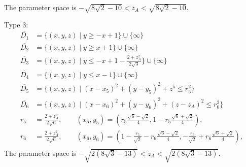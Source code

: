 \documentclass[suppldata, dvipdfmx]{interact}
\theoremstyle{plain}%
\theoremstyle{definition}
\theoremstyle{remark}
\theoremstyle{problemstyle}
\begin{document}
The parameter space is $-\sqrt{8\sqrt{2}-10} < z_A < \sqrt{8\sqrt{2} - 10}$.
\bigskip\par
Type 3:
\begin{align*}
\overline{D_1}&= \{ (x,y,z) \mid y \ge -x + 1 \} \cup \{ \infty \}\\
\overline{D_2}&= \{ (x,y,z) \mid y \ge x + 1 \} \cup \{ \infty \}\\
\overline{D_3}&= \{ (x,y,z) \mid y \le -x + 1 -\frac{2 + z_A^2}{2\sqrt{3}} \} \cup \{ \infty \}\\
\overline{D_4}&= \{ (x,y,z) \mid y \le x - 1 \} \cup \{ \infty \}\\
\overline{D_5}&=\{(x,y,z) \mid (x-x_5)^2+(y-y_5)^2+z^5 \le r_5^2 \} \\
\overline{D_6}&=\{(x,y,z) \mid (x-x_6)^2+(y-y_6)^2+(z-z_A)^2 \le r_6^2 \} \\
r_5 &= \frac{2 + z_A^2}{2 \sqrt{6}}, \qquad
(x_5, y_5) = \left( r_5\frac{\sqrt{6} - \sqrt{2}}{4},
 1 - r_5\frac{\sqrt{6} + \sqrt{2}}{4} \right), \\
r_6 &= \frac{2 + z_A^2}{2 \sqrt{6}}, \qquad
(x_6, y_6) = \left(1 - \frac{r_5}{\sqrt{2}} - r_6 \frac{\sqrt{6} -
 \sqrt{2}}{4}, -\frac{r_5}{\sqrt{2}} + r_6 \frac{\sqrt{6} + \sqrt{2}}{4}
 \right), \\
\end{align*}
The parameter space is $-\sqrt{2(8\sqrt{3} - 13)} < z_A < \sqrt{2(8\sqrt{3} - 13)}$.
\end{document}

